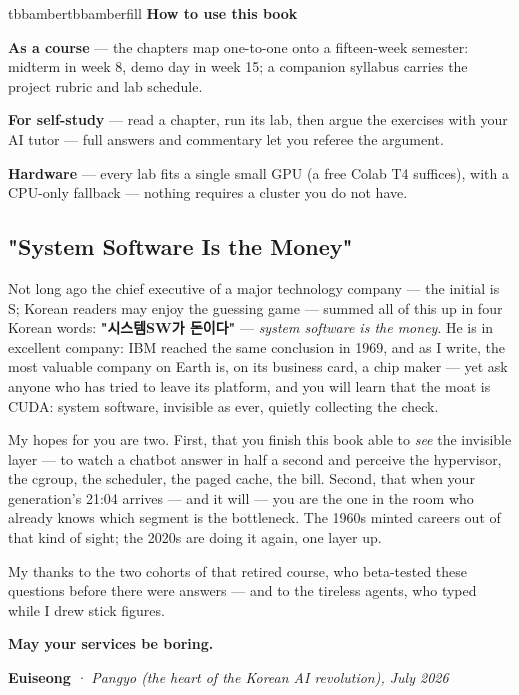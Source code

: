 \vspace{1.0pt}

\begin{calloutbox}{tbbamber}{tbbamberfill}
{\normalsize\bfseries\color{tbbamberdark}How to use this book}\par\vspace{3pt}
\begin{tbbitemize}
  \item \textbf{As a course} — the chapters map one-to-one onto a fifteen-week semester: midterm in week 8, demo day in week 15; a companion syllabus carries the project rubric and lab schedule.
  \item \textbf{For self-study} — read a chapter, run its lab, then argue the exercises with your AI tutor — full answers and commentary let you referee the argument.
  \item \textbf{Hardware} — every lab fits a single small GPU (a free Colab T4 suffices), with a CPU-only fallback — nothing requires a cluster you do not have.
\end{tbbitemize}
\end{calloutbox}

\vspace{1.5pt}

\subsection*{"System Software Is the Money"}

Not long ago the chief executive of a major technology company — the initial is S; Korean readers may enjoy the guessing game — summed all of this up in four Korean words: \textbf{"시스템SW가 돈이다"} — \textit{system software is the money}. He is in excellent company: IBM reached the same conclusion in 1969, and as I write, the most valuable company on Earth is, on its business card, a chip maker — yet ask anyone who has tried to leave its platform, and you will learn that the moat is CUDA: system software, invisible as ever, quietly collecting the check.

My hopes for you are two. First, that you finish this book able to \textit{see} the invisible layer — to watch a chatbot answer in half a second and perceive the hypervisor, the cgroup, the scheduler, the paged cache, the bill. Second, that when your generation's 21:04 arrives — and it will — you are the one in the room who already knows which segment is the bottleneck. The 1960s minted careers out of that kind of sight; the 2020s are doing it again, one layer up.

My thanks to the two cohorts of that retired course, who beta-tested these questions before there were answers — and to the tireless agents, who typed while I drew stick figures.

\textcolor{tbbink}{\textbf{May your services be boring.}}

{\raggedleft \textcolor{tbbink}{\textbf{Euiseong}}\textcolor{tbbgray}{\textit{  ·  Pangyo (the heart of the Korean AI revolution), July 2026}}\par}
